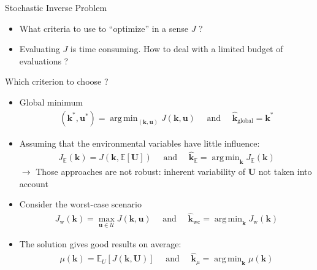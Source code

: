 \message{ !name(beamer_poster_2col.tex)}\documentclass{beamer}
\newlength{\sndcolwid}
\newcommand{\Ex}{\mathbb{E}}
\newcommand{\Var}{\mathbb{V}\mathrm{ar}}
\DeclareMathOperator*{\argmin}{arg\,min}
\newcommand{\kest}{\hat{\bm{k}}}
\begin{document}
\begin{frame}[t]
\begin{columns}[t]
\begin{column}{\sndcolwid}
\begin{block}{Stochastic Inverse Problem}
\begin{itemize}
\item What criteria to use to ``optimize'' in a sense $J$ ?
\item Evaluating $J$ is time consuming. How to deal with a limited budget of evaluations ?
\end{itemize}
\end{block}
\begin{block}{Which criterion to choose ? \nocite{lehman_designing_2004}}
  \begin{itemize}
  \item Global minimum
    \begin{align*}
      (\bm{k}^*,\bm{u}^*) = \argmin_{(\bm{k},\bm{u})} J(\bm{k},\bm{u})\quad \text{ and } \quad  \kest_{\mathrm{global}} = \bm{k}^*
    \end{align*}
  \item Assuming that the environmental variables have little influence:
    \begin{align*}
    J_{\Ex}(\bm{k}) = J(\bm{k}, \Ex[\bm U]) \quad \text{ and } \quad \kest_{\Ex} = \argmin_{\bm{k}} J_{\Ex}(\bm{k}) \tag{Classical methods}
    \end{align*}
$\longrightarrow$ Those approaches are not robust: inherent variability of $\bm{U}$ not taken into account \\[1.3ex]
  \item Consider the \alert{worst-case scenario} \nocite{wald_statistical_1945}
    \begin{align*}
      J_{\mathrm{w}}(\bm{k}) = \max_{\bm{u}\in\mathcal{U}} J(\bm{k},\bm{u}) \quad \text{ and } \quad \kest_{\mathrm{wc}} = \argmin_{\bm{k}} J_{\mathrm{w}}(\bm{k})      \tag{Explorative EGO}
    \end{align*}
    \item The solution gives \alert{good results on average}:
  \begin{align*}
    \mu(\bm{k}) = \Ex_U[J(\bm{k},\bm{U})]\quad \text{ and }  \quad  \kest_{\mu} = \argmin_{\bm{k}}  \mu(\bm{k}) \tag{Iterative EGO}
  \end{align*}


\end{itemize}
\end{block}
\end{column}
\end{columns}
\end{frame}
\end{document}
